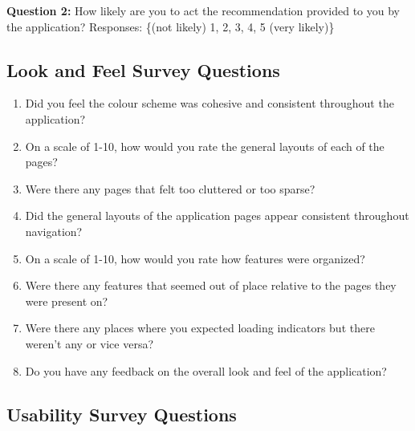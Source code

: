 \documentclass[12pt, titlepage]{article}
\begin{document}
\noindent \textbf{Question 2:} How likely are you to act the recommendation provided to you by the application?
Responses: \{(not likely) 1, 2, 3, 4, 5 (very likely)\}

\subsection{Look and Feel Survey Questions}

\begin{enumerate}
  \item Did you feel the colour scheme was cohesive and consistent throughout the application?
  \item On a scale of 1-10, how would you rate the general layouts of each of the pages?
  \item Were there any pages that felt too cluttered or too sparse?
  \item Did the general layouts of the application pages appear consistent throughout navigation?
  \item On a scale of 1-10, how would you rate how features were organized?
  \item Were there any features that seemed out of place relative to the pages they were present on?
  \item Were there any places where you expected loading indicators but there weren't any or vice versa?
  \item Do you have any feedback on the overall look and feel of the application?
\end{enumerate}

\subsection{Usability Survey Questions}
\end{document}

